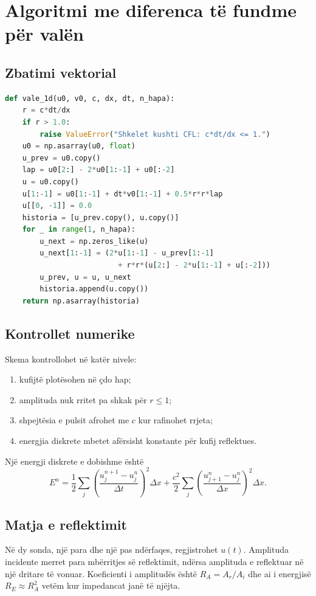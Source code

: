 \section{Algoritmi me diferenca të fundme për valën}
\subsection{Zbatimi vektorial}
\begin{lstlisting}[language=Python,caption={Skema eksplicite e valës me skaje të fiksuara.}]
def vale_1d(u0, v0, c, dx, dt, n_hapa):
    r = c*dt/dx
    if r > 1.0:
        raise ValueError("Shkelet kushti CFL: c*dt/dx <= 1.")
    u0 = np.asarray(u0, float)
    u_prev = u0.copy()
    lap = u0[2:] - 2*u0[1:-1] + u0[:-2]
    u = u0.copy()
    u[1:-1] = u0[1:-1] + dt*v0[1:-1] + 0.5*r*r*lap
    u[[0, -1]] = 0.0
    historia = [u_prev.copy(), u.copy()]
    for _ in range(1, n_hapa):
        u_next = np.zeros_like(u)
        u_next[1:-1] = (2*u[1:-1] - u_prev[1:-1]
                          + r*r*(u[2:] - 2*u[1:-1] + u[:-2]))
        u_prev, u = u, u_next
        historia.append(u.copy())
    return np.asarray(historia)
\end{lstlisting}

\subsection{Kontrollet numerike}
Skema kontrollohet në katër nivele:
\begin{enumerate}
\item kufijtë plotësohen në çdo hap;
\item amplituda nuk rritet pa shkak për $r\le1$;
\item shpejtësia e pulsit afrohet me $c$ kur rafinohet rrjeta;
\item energjia diskrete mbetet afërsisht konstante për kufij reflektues.
\end{enumerate}
Një energji diskrete e dobishme është
\begin{equation}
 E^n=\frac12\sum_j\left(\frac{u_j^{n+1}-u_j^n}{\Delta t}\right)^2\Delta x
 +\frac{c^2}{2}\sum_j\left(\frac{u_{j+1}^n-u_j^n}{\Delta x}\right)^2\Delta x.
\end{equation}

\subsection{Matja e reflektimit}
Në dy sonda, një para dhe një pas ndërfaqes, regjistrohet $u(t)$. Amplituda incidente merret para mbërritjes së reflektimit, ndërsa amplituda e reflektuar në një dritare të vonuar. Koeficienti i amplitudës është $R_A=A_r/A_i$ dhe ai i energjisë $R_E\approx R_A^2$ vetëm kur impedancat janë të njëjta.


